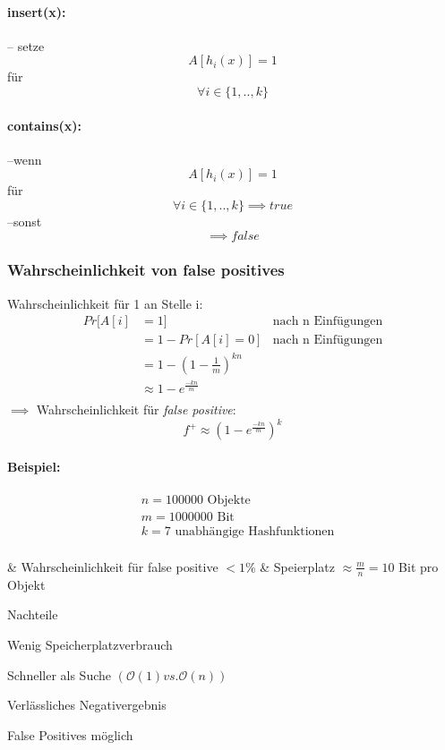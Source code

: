 \documentclass[a4paper]{scrartcl}
\begin{document}
		\paragraph{insert(x):}
		-- setze \[A [h_i (x)] = 1 \] für \[ \forall i \in \{1,..,k \} \]
		
		\paragraph{contains(x):}
		--wenn \[ A [h_i (x)] = 1 \] für \[ \forall i \in \{1,..,k\} \implies true \] --sonst \[ \implies false \]
	
		\subsubsection{Wahrscheinlichkeit von false positives}
		Wahrscheinlichkeit für 1 an Stelle i:\\
		\begin{align*}
			Pr[A[i] &= 1] & \text{nach n Einfügungen}\\
			&= 1 - Pr[A[i] = 0] & \text{nach n Einfügungen}\\
			&= 1 - ( 1 - \frac{1}{m} )^{kn}\\
			&\approx 1 - e^{\frac{-kn}{m}}\\ 
		\end{align*}
		\(\implies\) Wahrscheinlichkeit für \emph{false positive}: \[ f^+ \approx (1 - e ^{\frac{-kn}{m}})^k \]
		
		\paragraph{Beispiel:}
		\begin{align*}
			&n = 100 000 \text{ Objekte}\\
			&m = 1 000 000 \text{ Bit} \\
			&k = 7 \text{ unabhängige Hashfunktionen}\\
		\end{align*}
		\begin{easylist}
			& Wahrscheinlichkeit für false positive \( < 1 \% \) 
			& Speierplatz \( \approx \frac{m}{n} = 10  \) Bit pro Objekt
		\end{easylist}
	
		\begin{labeling}{Nachteile}
			\item[\emph{Vorteile}] 
			\item[+]  Wenig Speicherplatzverbrauch
			\item[+] Schneller als Suche \( ( \mathcal{O}(1) vs. \mathcal{O}  (n)) \)
			\item[+] Verlässliches Negativergebnis
			\item[\emph{Nachteile}] 
			\item[\(-\)] False Positives möglich
		\end{labeling}
\end{document}
